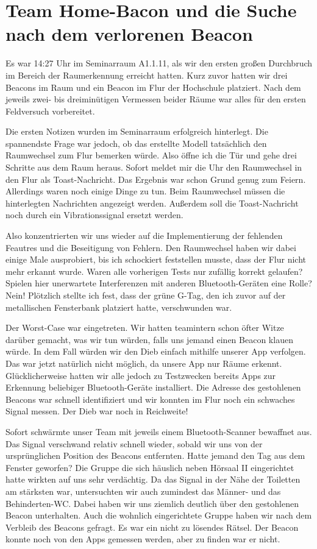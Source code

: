 \section{Team Home-Bacon und die Suche nach dem verlorenen Beacon}

Es war 14:27 Uhr im Seminarraum A1.1.11, als wir den ersten großen Durchbruch
im Bereich der Raumerkennung erreicht hatten. Kurz zuvor hatten wir drei Beacons
im Raum und ein Beacon im Flur der Hochschule platziert. Nach dem jeweils
zwei- bis dreiminütigen Vermessen beider Räume war alles für den ersten
Feldversuch vorbereitet.

Die ersten Notizen wurden im Seminarraum erfolgreich hinterlegt. Die spannendste
Frage war jedoch, ob das erstellte Modell tatsächlich den Raumwechsel zum Flur 
bemerken würde. Also öffne ich die Tür und gehe drei Schritte aus dem Raum heraus.
Sofort meldet mir die Uhr den Raumwechsel in den Flur als Toast-Nachricht. Das 
Ergebnis war schon Grund genug zum Feiern. Allerdings waren noch einige Dinge
zu tun. Beim Raumwechsel müssen die hinterlegten Nachrichten angezeigt werden.
Außerdem soll die Toast-Nachricht noch durch ein Vibrationssignal ersetzt werden.

Also konzentrierten wir uns wieder auf die Implementierung der fehlenden
Feautres und die Beseitigung von Fehlern. Den Raumwechsel haben wir dabei einige
Male ausprobiert, bis ich schockiert feststellen musste, dass der Flur nicht
mehr erkannt wurde. Waren alle vorherigen Tests nur zufällig korrekt gelaufen?
Spielen hier unerwartete Interferenzen mit anderen Bluetooth-Geräten eine Rolle?
Nein! Plötzlich stellte ich fest, dass der grüne G-Tag, den ich zuvor auf der
metallischen Fensterbank platziert hatte, verschwunden war.

Der Worst-Case war eingetreten. Wir hatten teamintern schon öfter Witze darüber
gemacht, was wir tun würden, falls uns jemand einen Beacon klauen würde.
In dem Fall würden wir den Dieb einfach mithilfe unserer App verfolgen.
Das war jetzt natürlich nicht möglich, da unsere App nur Räume erkennt.
Glücklicherweise hatten wir alle jedoch zu Testzwecken bereits Apps zur Erkennung
beliebiger Bluetooth-Geräte installiert. Die Adresse des gestohlenen Beacons
war schnell identifiziert und wir konnten im Flur noch ein schwaches Signal
messen. Der Dieb war noch in Reichweite!

Sofort schwärmte unser Team mit jeweils einem Bluetooth-Scanner bewaffnet aus.
Das Signal verschwand relativ schnell wieder, sobald wir uns von der ursprünglichen
Position des Beacons entfernten. Hatte jemand den Tag aus dem Fenster geworfen?
Die Gruppe die sich häuslich neben Hörsaal II eingerichtet hatte wirkten auf uns
sehr verdächtig. Da das Signal in der Nähe der Toiletten am stärksten war,
untersuchten wir auch zumindest das Männer- und das Behinderten-WC. Dabei haben wir
uns ziemlich deutlich über den gestohlenen Beacon unterhalten. Auch die
wohnlich eingerichtete Gruppe haben wir nach dem Verbleib des Beacons gefragt.
Es war ein nicht zu lösendes Rätsel. Der Beacon konnte noch von den Apps gemessen
werden, aber zu finden war er nicht.

